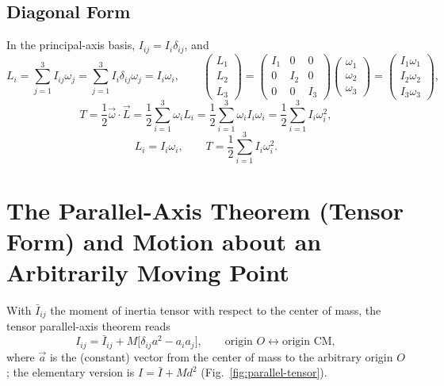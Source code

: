 \documentclass[11pt]{article}
\begin{document}
\subsection{Diagonal Form}

In the principal-axis basis, $I_{ij}=I_i\delta_{ij}$, and
\begin{equation}
L_i = \sum_{j=1}^3 I_{ij}\omega_j = \sum_{j=1}^3 I_i\delta_{ij}\omega_j = I_i\omega_i, \qquad
\begin{pmatrix}L_1\\L_2\\L_3\end{pmatrix} = \begin{pmatrix}I_1&0&0\\0&I_2&0\\0&0&I_3\end{pmatrix}\begin{pmatrix}\omega_1\\\omega_2\\\omega_3\end{pmatrix} = \begin{pmatrix}I_1\omega_1\\I_2\omega_2\\I_3\omega_3\end{pmatrix},
\label{eq:diag-L}
\end{equation}
\begin{equation}
T = \frac12\vec\omega\cdot\vec L = \frac12\sum_{i=1}^3\omega_iL_i = \frac12\sum_{i=1}^3\omega_iI_i\omega_i = \frac12\sum_{i=1}^3 I_i\omega_i^2,
\label{eq:diag-T}
\end{equation}
\begin{equation}
\boxed{L_i = I_i\omega_i,} \qquad \boxed{T = \frac12\sum_{i=1}^3 I_i\omega_i^2.}
\label{eq:diag-boxed}
\end{equation}

\section{The Parallel-Axis Theorem (Tensor Form) and Motion about an Arbitrarily Moving Point}

With $\bar I_{ij}$ the moment of inertia tensor with respect to the center of mass, the tensor parallel-axis theorem reads
\begin{equation}
\boxed{I_{ij} = \bar I_{ij} + M\big[\delta_{ij}a^2-a_ia_j\big],} \qquad \text{origin } O \longleftrightarrow \text{origin CM},
\label{eq:parallel-tensor}
\end{equation}
where $\vec a$ is the (constant) vector from the center of mass to the arbitrary origin $O$; the elementary version is $I=\bar I+Md^2$ (Fig.~\ref{fig:parallel-tensor}).
\end{document}
